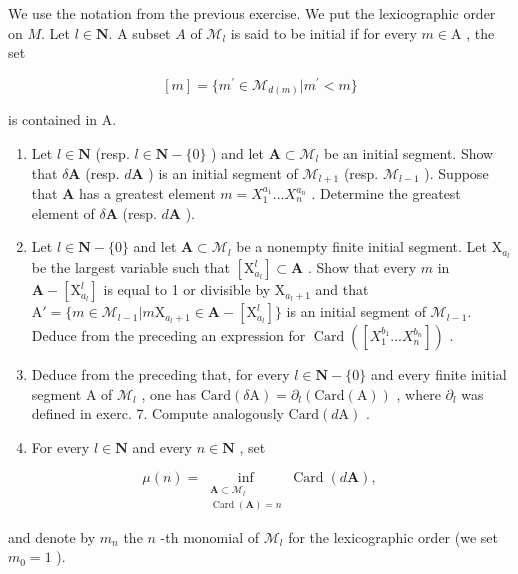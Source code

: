   We use the notation from the previous exercise. We put the lexicographic order on \(M\). Let \(l \in \mathbf{N}\). A subset \(A\) of \(\mathcal{M}_{l}\) is said to be initial if for every \(m \in \mathrm{A}\) , the set

\[
[ m ] = \{m ^ {\prime} \in \mathcal {M} _ {d (m)} | m ^ {\prime} <   m \}
\]

is contained in A.

\begin{enumerate}
\def\labelenumi{\alph{enumi})}
\item
  Let \(l \in \mathbf{N}\) (resp. \(l \in \mathbf{N} - \{0\}\) ) and let \(\mathbf{A} \subset \mathcal{M}_l\) be an initial segment. Show that \(\delta \mathbf{A}\) (resp. \(d\mathbf{A}\) ) is an initial segment of \(\mathcal{M}_{l+1}\) (resp. \(\mathcal{M}_{l-1}\) ). Suppose that \(\mathbf{A}\) has a greatest element \(m = X_1^{a_1} \ldots X_n^{a_n}\) . Determine the greatest element of \(\delta \mathbf{A}\) (resp. \(d\mathbf{A}\) ).
\item
  Let \(l \in \mathbf{N} - \{0\}\) and let \(\mathbf{A} \subset \mathcal{M}_l\) be a nonempty finite initial segment. Let \(\mathrm{X}_{a_l}\) be the largest variable such that \([\mathrm{X}_{a_l}^l] \subset \mathbf{A}\) . Show that every \(m\) in \(\mathbf{A} - [\mathrm{X}_{a_l}^l]\) is equal to 1 or divisible by \(\mathrm{X}_{a_l + 1}\) and that \(\mathrm{A}' = \{m \in \mathcal{M}_{l-1}|m\mathrm{X}_{a_l + 1} \in \mathbf{A} - [\mathrm{X}_{a_l}^l]\}\) is an initial segment of \(\mathcal{M}_{l-1}\). Deduce from the preceding an expression for \(\operatorname{Card}([X_1^{b_1} ... X_n^{b_n}])\) .
\item
  Deduce from the preceding that, for every \(l \in \mathbf{N} - \{0\}\) and every finite initial segment A of \(\mathcal{M}_l\) , one has \(\text{Card}(\delta\text{A}) = \partial_l(\text{Card}(\text{A}))\) , where \(\partial_l\) was defined in exerc. 7. Compute analogously \(\text{Card}(d\text{A})\) .
\item
  For every \(l \in \mathbf{N}\) and every \(n \in \mathbf{N}\) , set
\end{enumerate}

\[
\mu (n) = \inf_{\substack{\mathbf{A}\subset \mathcal{M}_{l}\\ \operatorname{Card}(\mathbf{A}) = n}}\operatorname{Card}(d\mathbf{A}),
\]

and denote by \(m_{n}\) the \(n\) -th monomial of \(\mathcal{M}_{l}\) for the lexicographic order (we set \(m_{0}=1\) ).

